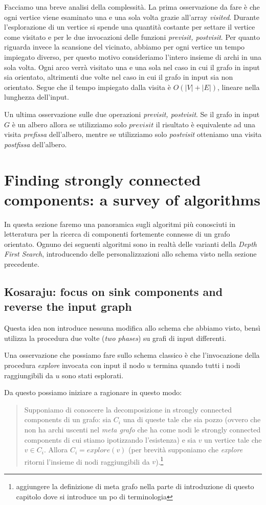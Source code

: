 Facciamo una breve analisi della complessit\`a. La prima osservazione
da fare \`e che ogni vertice viene esaminato una e una sola volta
grazie all'array \emph{visited}. Durante l'esplorazione di un vertice
si spende una quantit\`a costante per settare il vertice come visitato
e per le due invocazioni delle funzioni \emph{previsit,
  postvisit}. Per quanto riguarda invece la scansione del vicinato,
abbiamo per ogni vertice un tempo impiegato diverso, per questo motivo
consideriamo l'intero insieme di archi in una sola volta. Ogni arco
verr\`a visitato una e una sola nel caso in cui il grafo in input sia
orientato, altrimenti due volte nel caso in cui il grafo in input sia
non orientato. Segue che il tempo impiegato dalla visita \`e $O(|V| +
|E|)$, lineare nella lunghezza dell'input.

Un ultima osservazione sulle due operazioni \emph{previsit,
  postvisit}. Se il grafo in input $G$ \`e un albero allora se
utilizziamo solo $previsit$ il risultato \`e equivalente ad una visita
\emph{prefissa} dell'albero, mentre se utilizziamo solo
\emph{postvisit} otteniamo una visita \emph{postfissa} dell'albero.

\section{Finding strongly connected components: a survey of
  algorithms}

In questa sezione faremo una panoramica sugli algoritmi pi\`u
conosciuti in letteratura per la ricerca di componenti fortemente
connesse di un grafo orientato. Ognuno dei seguenti algoritmi sono in
realt\`a delle varianti della \emph{Depth First Search}, introducendo
delle personalizzazioni allo schema visto nella sezione precedente.

\subsection{Kosaraju: focus on sink components and reverse the input
  graph}

Questa idea non introduce nessuna modifica allo schema che abbiamo
visto, bens\`i utilizza la procedura due volte (\emph{two phases}) su
grafi di input differenti.

Una osservazione che possiamo fare sullo schema classico \`e che
l'invocazione della procedura \emph{explore} invocata con input il
nodo $u$ termina quando tutti i nodi raggiungibili da $u$ sono stati
esplorati.

Da questo possiamo iniziare a ragionare in questo modo:
\begin{quotation}
  Supponiamo di conoscere la decomposizione in strongly connected
  components di un grafo: sia $C_{i}$ una di queste tale che sia pozzo
  (ovvero che non ha archi uscenti nel \emph{meta grafo} che ha come
  nodi le strongly connected components di cui stiamo ipotizzando
  l'esistenza) e sia $v$ un vertice tale che $v \in C_{i}$. Allora
  $C_{i} = explore(v)$ (per brevit\`a supponiamo che \emph{explore}
  ritorni l'insieme di nodi raggiungibili da $v$).\footnote{aggiungere
    la definizione di meta grafo nella parte di introduzione di questo
    capitolo dove si introduce un po di terminologia}
\end{quotation}


